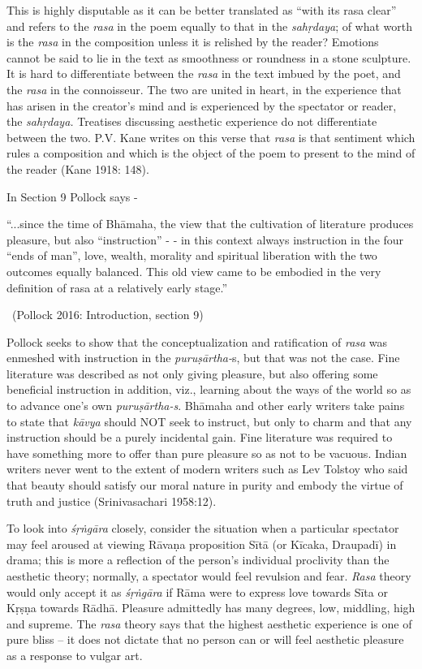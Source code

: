 This is highly disputable as it can be better translated as “with its rasa clear” and refers to the \textit{rasa }in the poem equally to that in the \textit{sahṛdaya}; of what worth is the \textit{rasa} in the composition unless it is relished by the reader? Emotions cannot be said to lie in the text as smoothness or roundness in a stone sculpture. It is hard to differentiate between the \textit{rasa} in the text imbued by the poet, and the \textit{rasa} in the connoisseur. The two are united in heart, in the experience that has arisen in the creator’s mind and is experienced by the spectator or reader, the \textit{sahṛdaya.} Treatises discussing aesthetic experience do not differentiate between the two. P.V. Kane writes on this verse that \textit{rasa} is that sentiment which rules a composition and which is the object of the poem to present to the mind of the reader (Kane 1918: 148).

In Section 9 Pollock says -

\begin{myquote}
“...since the time of Bhāmaha, the view that the cultivation of literature produces pleasure, but also “instruction” - - in this context always instruction in the four “ends of man”, love, wealth, morality and spiritual liberation with the two outcomes equally balanced. This old view came to be embodied in the very definition of rasa at a relatively early stage.” 

~\hfill (Pollock 2016: Introduction, section 9)
\end{myquote}

Pollock seeks to show that the conceptualization and ratification of \textit{rasa} was enmeshed with instruction in the \textit{puruṣārtha-}s, but that was not the case. Fine literature was described as not only giving pleasure, but also offering some beneficial instruction in addition, viz., learning about the ways of the world so as to advance one’s own \textit{puruṣārtha-s}. Bhāmaha and other early writers take pains to state that \textit{kāvya} should NOT seek to instruct, but only to charm and that any instruction should be a purely incidental gain. Fine literature was required to have something more to offer than pure pleasure so as not to be vacuous. Indian writers never went to the extent of modern writers such as Lev Tolstoy who said that beauty should satisfy our moral nature in purity and embody the virtue of truth and justice (Srinivasachari 1958:12).

To look into \textit{śṛṅgāra} closely, consider the situation when a particular spectator may feel aroused at viewing Rāvaṇa proposition Sītā (or Kīcaka, Draupadī) in drama; this is more a reflection of the person’s individual proclivity than the aesthetic theory; normally, a spectator would feel revulsion and fear. \textit{Rasa} theory would only accept it as \textit{śṛṅgāra} if Rāma were to express love towards Sīta or Kṛṣṇa towards Rādhā. Pleasure admittedly has many degrees, low, middling, high and supreme. The \textit{rasa} theory says that the highest aesthetic experience is one of pure bliss – it does not dictate that no person can or will feel aesthetic pleasure as a response to vulgar art.

